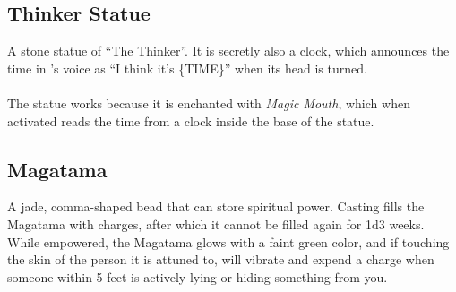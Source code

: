 \subsection{Thinker Statue}
\label{items:thinker}
A stone statue of ``The Thinker''. It is secretly also a clock, which announces the time in 's voice as ``I think it's \{TIME\}'' when its head is turned. \\
\\
The statue works because it is enchanted with \textit{Magic Mouth}, which when activated reads the time from a clock inside the base of the statue.

\subsection{Magatama}
\label{items:magatama}
A jade, comma-shaped bead that can store spiritual power. Casting  fills the Magatama with charges, after which it cannot be filled again for 1d3 weeks. While empowered, the Magatama glows with a faint green color, and if touching the skin of the person it is attuned to, will vibrate and expend a charge when someone within 5 feet is actively lying or hiding something from you.